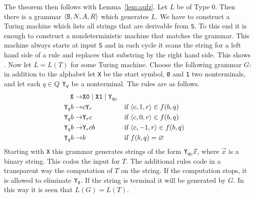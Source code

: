 The theorem then follows with Lemma~\ref{lem:aufz}. Let $L$ be of Type 0. 
Then there is a grammar $\langle \mbox{\tt S}, N, A, R\rangle$ which generates 
$L$. We have to construct a Turing machine which lists all strings 
that are derivable from {\tt S}. To this end it is enough to construct 
a nondeterministic machine that matches the grammar. This machine 
always starts at input {\tt S} and in each cycle it scans the string 
for a left hand side of a rule and replaces that substring by the 
right hand side. This shows . Now let $L = L(T)$ for some 
Turing machine. Choose the following grammar $G$: in addition to the 
alphabet let {\tt X} be the start symbol, {\tt 0} and {\tt 1} two 
nonterminals, and let each $q \in Q$ $\mbox{\tt Y}_q$ be a 
nonterminal. The rules are as follows.
\begin{align}\notag
\mbox{\tt X}\rightarrow & \mbox{\tt X0} \mid \mbox{\tt X1}
    \mid \mbox{\tt Y}_{q_0} \\\notag
\mbox{\tt Y}_q b \rightarrow & c \mbox{\tt Y}_r 
	&& \text{if $\langle c, 1, r\rangle \in f(b,q)$} \\
\mbox{\tt Y}_q b \rightarrow & \mbox{\tt Y}_r c 
	&& \text{if $\langle c, 0, r\rangle \in f(b,q)$} \\\notag
\mbox{\tt Y}_q b \rightarrow & \mbox{\tt Y}_r c b 
	&& \text{if $\langle c, -1, r\rangle \in f(b,q)$} \\\notag
\mbox{\tt Y}_q b \rightarrow & b 
	&& \text{if $f(b,q) = \varnothing$}
\end{align}
Starting with {\tt X} this grammar generates strings of the form
$\mbox{\tt Y}_{q_0} \vec{x}$, where $\vec{x}$ is a binary string.
This codes the input for $T$. The additional rules code in a
transparent way the computation of $T$ on the string. If the
computation stops, it is allowed to eliminate $\mbox{\tt Y}_q$.
If the string is terminal it will be generated by $G$. In this
way it is seen that $L(G) = L(T)$.
\proofend

